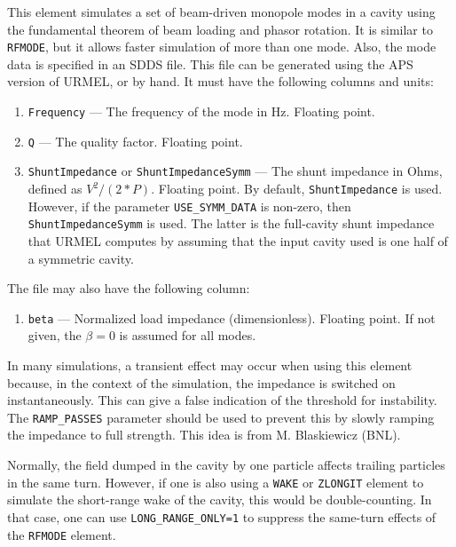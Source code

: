 This element simulates a set of beam-driven monopole modes in a cavity using the fundamental theorem of beam loading and phasor rotation.
It is similar to {\tt RFMODE}, but it allows faster simulation of more than
one mode.  Also, the mode data is specified in an SDDS file.  This file can be
generated using the APS version of URMEL, or by hand. It must have the following
columns and units:
\begin{enumerate}
\item {\tt Frequency} --- The frequency of the mode in Hz.  Floating point.
\item {\tt Q} --- The quality factor.  Floating point.
\item {\tt ShuntImpedance} or {\tt ShuntImpedanceSymm} --- The shunt
  impedance in Ohms, defined as $V^2/(2*P)$.   Floating point. By default, {\tt ShuntImpedance} is
  used.  However, if the parameter \verb|USE_SYMM_DATA| is non-zero, then 
  {\tt ShuntImpedanceSymm}  is used.  The latter is the full-cavity 
  shunt impedance that URMEL computes
  by assuming that the input cavity used is one half of a symmetric cavity.
\end{enumerate}

The file may also have the following column:
\begin{enumerate}
\item {\tt beta} --- Normalized load impedance (dimensionless).   Floating point.  If not given, the
 $\beta=0$ is assumed for all modes.
\end{enumerate}

In many simulations, a transient effect may occur when using this
element because, in the context of the simulation, the impedance is
switched on instantaneously.  This can give a false indication of the
threshold for instability. The {\tt RAMP\_PASSES} parameter should
be used to prevent this by slowly ramping the impedance to full
strength.  This idea is from M. Blaskiewicz (BNL).

Normally, the field dumped in the cavity by one particle affects trailing particles in the same turn.
However, if one is also using a \verb|WAKE| or \verb|ZLONGIT| element to simulate the short-range wake of the cavity, this would be double-counting.
In that case, one can use \verb|LONG_RANGE_ONLY=1| to suppress the same-turn effects of the \verb|RFMODE| element.
